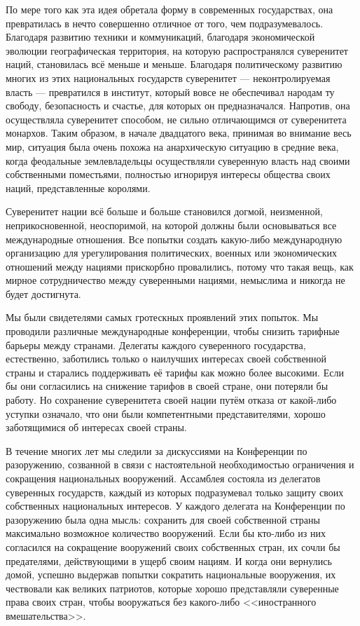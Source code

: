 По мере того как эта идея обретала форму в современных государствах, она превратилась в нечто совершенно отличное от того, чем подразумевалось. Благодаря развитию техники и коммуникаций, благодаря экономической эволюции географическая территория, на которую распространялся суверенитет наций, становилась всё меньше и меньше. Благодаря политическому развитию многих из этих национальных государств суверенитет — неконтролируемая власть — превратился в институт, который вовсе не обеспечивал народам ту свободу, безопасность и счастье, для которых он предназначался. Напротив, она осуществляла суверенитет способом, не сильно отличающимся от суверенитета монархов. Таким образом, в начале двадцатого века, принимая во внимание весь мир, ситуация была очень похожа на анархическую ситуацию в средние века, когда феодальные землевладельцы осуществляли суверенную власть над своими собственными поместьями, полностью игнорируя интересы общества своих наций, представленные королями.

Суверенитет нации всё больше и больше становился догмой, неизменной, неприкосновенной, неоспоримой, на которой должны были основываться все международные отношения. Все попытки создать какую-либо международную организацию для урегулирования политических, военных или экономических отношений между нациями прискорбно провалились, потому что такая вещь, как мирное сотрудничество между суверенными нациями, немыслима и никогда не будет достигнута.

Мы были свидетелями самых гротескных проявлений этих попыток. Мы проводили различные международные конференции, чтобы снизить тарифные барьеры между странами. Делегаты каждого суверенного государства, естественно, заботились только о наилучших интересах своей собственной страны и старались поддерживать её тарифы как можно более высокими. Если бы они согласились на снижение тарифов в своей стране, они потеряли бы работу. Но сохранение суверенитета своей нации путём отказа от какой-либо уступки означало, что они были компетентными представителями, хорошо заботящимися об интересах своей страны.

В течение многих лет мы следили за дискуссиями на Конференции по разоружению, созванной в связи с настоятельной необходимостью ограничения и сокращения национальных вооружений. Ассамблея состояла из делегатов суверенных государств, каждый из которых подразумевал только защиту своих собственных национальных интересов. У каждого делегата на Конференции по разоружению была одна мысль: сохранить для своей собственной страны максимально возможное количество вооружений. Если бы кто-либо из них согласился на сокращение вооружений своих собственных стран, их сочли бы предателями, действующими в ущерб своим нациям. И когда они вернулись домой, успешно выдержав попытки сократить национальные вооружения, их чествовали как великих патриотов, которые хорошо представляли суверенные права своих стран, чтобы вооружаться без какого-либо <<иностранного вмешательства>>.

